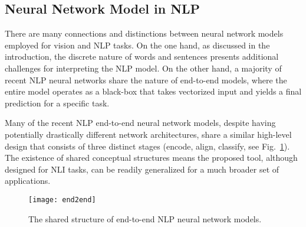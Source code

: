 

\subsection{Neural Network Model in NLP}
There are many connections and distinctions between neural network models employed for vision and NLP tasks.
On the one hand, as discussed in the introduction, the discrete nature of words and sentences presents additional challenges for
interpreting the NLP model.
%
On the other hand, a majority of recent NLP neural networks share the nature of
end-to-end models, where the entire model operates as a black-box that takes
vectorized input and yields a final prediction for a specific task.
%

Many of the recent NLP end-to-end neural network models, despite having potentially drastically different network architectures, share a similar high-level design that consists of three distinct stages (encode, align, classify, see Fig.~\ref{fig:modelPipeline}).
%
The existence of shared conceptual structures means the proposed tool, although designed for NLI tasks, can be readily generalized for a much broader set of applications.

\begin{figure}[htbp]
\vspace{-2mm}
\centering
 \texttt{[image: end2end]}
 \vspace{-5mm}
 \caption{The shared structure of end-to-end NLP neural network models.}
  \vspace{-2mm}
\label{fig:modelPipeline}
\end{figure}

